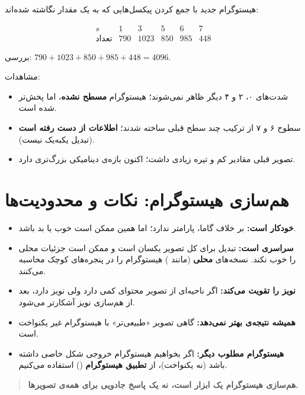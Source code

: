 \documentclass[11pt,a4paper]{article}
\begin{document}
	هیستوگرام جدید با جمع کردن پیکسل‌هایی که به یک مقدار نگاشته شده‌اند:
	
	\[
	\begin{array}{c|ccccc}
		s & 1 & 3 & 5 & 6 & 7\\
		\hline
		\text{تعداد} & 790 & 1023 & 850 & 985 & 448
	\end{array}
	\]
	
	بررسی: $790+1023+850+985+448=4096$.
	
	مشاهدات:
	
	\begin{itemize}
		\item شدت‌های ۰، ۲ و ۴ دیگر ظاهر نمی‌شوند؛ هیستوگرام \textbf{مسطح نشده}، اما پخش‌تر شده است.
		\item سطوح ۶ و ۷ از ترکیب چند سطح قبلی ساخته شدند؛ \textbf{اطلاعات از دست رفته است}
		(تبدیل یکبه‌یک نیست).
		\item تصویر قبلی مقادیر کم و تیره زیادی داشت؛ اکنون بازه‌ی دینامیکی بزرگ‌تری دارد.
	\end{itemize}
	
	
	\section{هم‌سازی هیستوگرام: نکات و محدودیت‌ها}
	
	\begin{itemize}
		\item \textbf{خودکار است:} بر خلاف گاما، پارامتر ندارد؛ اما همین ممکن است خوب یا بد باشد.
		\item \textbf{سراسری است:} تبدیل برای کل تصویر یکسان است و ممکن است جزئیات محلی را خوب نکند.
		نسخه‌های \textbf{محلی} (مانند ) هیستوگرام را در پنجره‌های کوچک محاسبه می‌کنند.
		\item \textbf{نویز را تقویت می‌کند:} اگر ناحیه‌ای از تصویر محتوای کمی دارد ولی نویز دارد،
		بعد از هم‌سازی نویز آشکارتر می‌شود.
		\item \textbf{همیشه نتیجه‌ی بهتر نمی‌دهد:} گاهی تصویر «طبیعی‌تر» با هیستوگرام غیر یکنواخت است.
		\item \textbf{هیستوگرام مطلوب دیگر:} اگر بخواهیم هیستوگرام خروجی شکل خاصی داشته باشد
		(نه یکنواخت)، از \textbf{تطبیق هیستوگرام} () استفاده می‌کنیم.
	\end{itemize}
	
	\begin{quote}
		\textbf{هم‌سازی هیستوگرام یک ابزار است، نه یک پاسخ جادویی برای همه‌ی تصویرها.}
	\end{quote}
	
\end{document}
